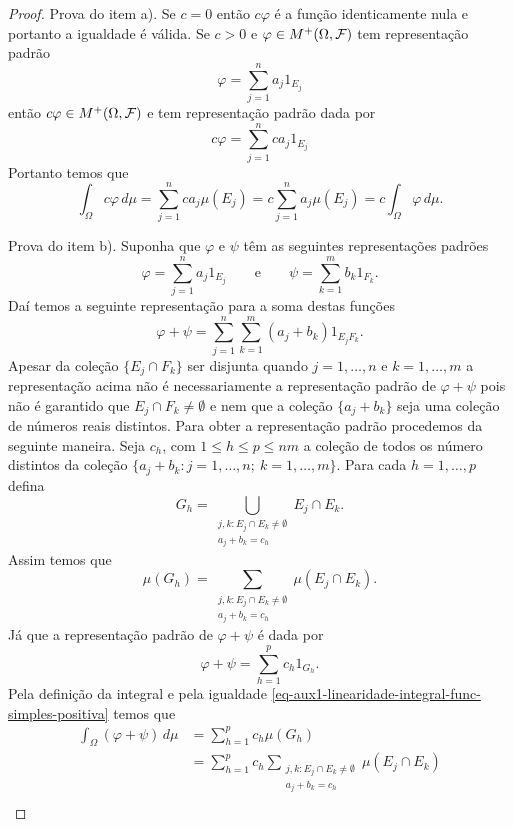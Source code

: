 \begin{proof}
Prova do item a). Se $c=0$ então $c\varphi$ é a função 
identicamente nula e portanto a igualdade é válida. 
Se $c>0$ e $\varphi\in M^{+}(\Omega,\mathcal{F})$ tem 
representação padrão 
	\[
		\varphi  
		=
		\sum_{j=1}^n a_j 1_{E_j} 
	\]
então $c\varphi\in M^{+}(\Omega,\mathcal{F})$ e tem 
representação padrão dada por 
	\[
		c\varphi  
		=
		\sum_{j=1}^n ca_j 1_{E_j} 
	\]
Portanto temos que 
	\[
	\int_{\Omega} c\varphi\, d\mu
	=
	\sum_{j=1}^n ca_{j} \mu(E_j)
	=
	c \sum_{j=1}^n a_{j} \mu(E_j)
	=
	c \int_{\Omega} \varphi\, d\mu.
	\]



Prova do item b). Suponha que $\varphi$ e $\psi$ têm as 
seguintes representações padrões
	\[
		\varphi  
		=
		\sum_{j=1}^n a_j 1_{E_j} 
		\qquad
		\text{e}
		\qquad
		\psi 
		=
		\sum_{k=1}^m b_k 1_{F_k}.
	\]
Daí temos a seguinte representação para a soma 
destas funções 
	\[
		\varphi+\psi
		=
		\sum_{j=1}^n\sum_{k=1}^m (a_j+b_k) 1_{E_jF_k}.
	\]
Apesar da coleção $\{E_j\cap F_k\}$ ser disjunta 
quando $j=1,\ldots,n$ e $k=1,\ldots,m$ a representação
acima não é necessariamente a 
representação padrão de $\varphi+\psi$ 
pois não é garantido que $E_j\cap F_k\neq \emptyset$ 
e nem que a coleção $\{a_j+b_k\}$ seja uma coleção de
números reais distintos. Para obter a representação 
padrão procedemos da seguinte maneira. 
Seja $c_h$, com $1\leq h\leq p\leq nm$ a coleção 
de todos os número distintos da coleção 
$\{ a_j+b_k: j=1,\ldots,n;\ k=1,\ldots,m\}$. 
Para cada $h=1,\ldots, p$ defina 
	\[
		G_h
		=
		\bigcup_{ \substack {j,k : E_j\cap E_k\neq \emptyset \\a_j+b_k=c_h}  }
		E_j\cap E_k.
	\] 
Assim temos que 
	\begin{equation}\label{eq-aux1-linearidade-integral-func-simples-positiva}
		\mu(G_h)
		=
		\sum_{ \substack {j,k : E_j\cap E_k\neq \emptyset \\a_j+b_k=c_h}  }
		\mu(E_j\cap E_k).
	\end{equation} 
Já que a representação padrão de $\varphi+\psi$ é dada por 
	\[
		\varphi+\psi = \sum_{h=1}^p c_h 1_{G_h}.
	\]
Pela definição da integral e pela igualdade 
\eqref{eq-aux1-linearidade-integral-func-simples-positiva} 
temos que 
\begin{align*}
\int_{\Omega}(\varphi+\psi)\, d\mu 
&= 
\sum_{h=1}^p c_h \mu(G_h)
\\
&=
\sum_{h=1}^p 
	c_h 
	\sum_{ \substack {j,k : E_j\cap E_k\neq \emptyset \\a_j+b_k=c_h}  }
		\mu(E_j\cap E_k)
\\

\end{align*}
\end{proof}
